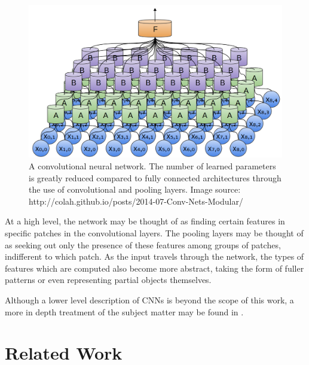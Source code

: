 \documentclass[letterpaper, 12 pt, conference]{ieeeconf}  %
\begin{document}
\begin{figure}[h]
\centering
\includegraphics[scale=0.15]{cnn}
\caption{A convolutional neural network. The number of learned parameters is greatly reduced compared to fully connected architectures through the use of convolutional and pooling layers. Image source: http://colah.github.io/posts/2014-07-Conv-Nets-Modular/}
\end{figure}

At a high level, the network may be thought of as finding certain features in specific patches in the convolutional layers. The pooling layers may be thought of as seeking out only the presence of these features among groups of patches, indifferent to which patch. As the input travels through the network, the types of features which are computed also become more abstract, taking the form of fuller patterns or even representing partial objects themselves. 
\par
Although a lower level description of CNNs is beyond the scope of this work, a more in depth treatment of the subject matter may be found in \cite{deeplearningbook, AlexNet}. 
 

\section{Related Work}
\end{document}
